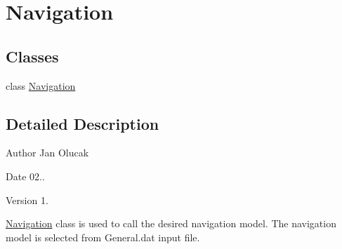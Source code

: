 \hypertarget{group___navigtion}{}\section{Navigation}
\label{group___navigtion}
\subsection*{Classes}
\begin{DoxyCompactItemize}
\item 
class \hyperlink{class_navigation}{Navigation}
\end{DoxyCompactItemize}


\subsection{Detailed Description}
\begin{DoxyAuthor}{Author}
Jan Olucak 
\end{DoxyAuthor}
\begin{DoxyDate}{Date}
02.. 
\end{DoxyDate}
\begin{DoxyVersion}{Version}
1.
\end{DoxyVersion}
\hyperlink{class_navigation}{Navigation} class is used to call the desired navigation model. The navigation model is selected from General.\+dat input file. 
